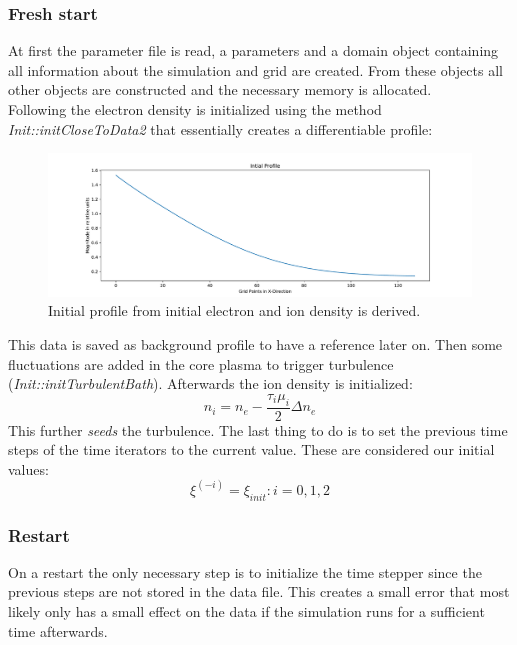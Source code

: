 \subsubsection{Fresh start}
At first the parameter file is read, a parameters and a domain object containing all information about the simulation and grid are created. From these objects all other objects are constructed and the necessary memory is allocated.\\
Following the electron density is initialized using the method \textit{Init::initCloseToData2} that essentially creates a differentiable profile:
\begin{figure}[!hbt]
    \centering
    \includegraphics[width=\linewidth]{pdfs/initial_profile.pdf}
    \caption{Initial profile from initial electron and ion density is derived.}
    \label{fig:initial_profile}
\end{figure}

This data is saved as background profile to have a reference later on.
Then some fluctuations are added in the core plasma to trigger turbulence (\textit{Init::initTurbulentBath}). Afterwards the ion density is initialized:
\begin{equation}
    n_i = n_e - \frac{\tau_i \mu_i}{2} \Delta n_e
\end{equation}
This further \textit{seeds} the turbulence. The last thing to do is to set the previous time steps of the time iterators to the current value. These are considered our initial values:
\begin{equation}
    \xi^{(-i)} = \xi_{init} \colon i = 0, 1, 2
\end{equation}


\subsubsection{Restart}
On a restart the only necessary step is to initialize the time stepper since the previous steps are not stored in the data file. This creates a small error that most likely only has a small effect on the data if the simulation runs for a sufficient time afterwards.

